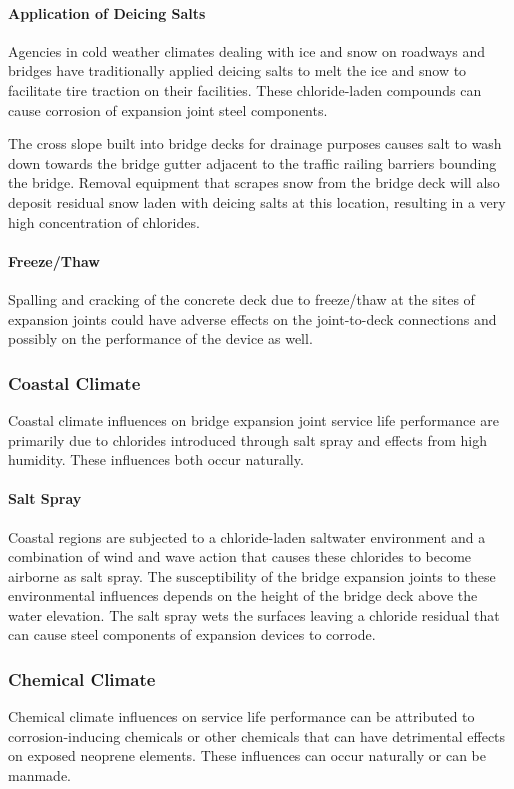 \paragraph{Application of Deicing Salts}
Agencies in cold weather climates dealing with ice and snow on roadways and bridges have traditionally applied
deicing salts to melt the ice and snow to facilitate tire traction on their facilities. These chloride-laden compounds can
cause corrosion of expansion joint steel components.

The cross slope built into bridge decks for drainage purposes causes salt to wash down towards the bridge gutter
adjacent to the traffic railing barriers bounding the bridge. Removal equipment that scrapes snow from the bridge
deck will also deposit residual snow laden with deicing salts at this location, resulting in a very high concentration of
chlorides.

\paragraph{Freeze/Thaw}
Spalling and cracking of the concrete deck due to freeze/thaw at the sites of expansion joints could have adverse
effects on the joint-to-deck connections and possibly on the performance of the device as well.

\subsubsection{Coastal Climate}
Coastal climate influences on bridge expansion joint service life performance are primarily due to chlorides
introduced through salt spray and effects from high humidity. These influences both occur naturally.

\paragraph*{Salt Spray}
Coastal regions are subjected to a chloride-laden saltwater environment and a combination of wind and wave
action that causes these chlorides to become airborne as salt spray. The susceptibility of the bridge expansion joints
to these environmental influences depends on the height of the bridge deck above the water elevation. The salt spray
wets the surfaces leaving a chloride residual that can cause steel components of expansion devices to corrode.

\subsubsection{Chemical Climate}
Chemical climate influences on service life performance can be attributed to corrosion-inducing chemicals or
other chemicals that can have detrimental effects on exposed neoprene elements. These influences can occur
naturally or can be manmade.

